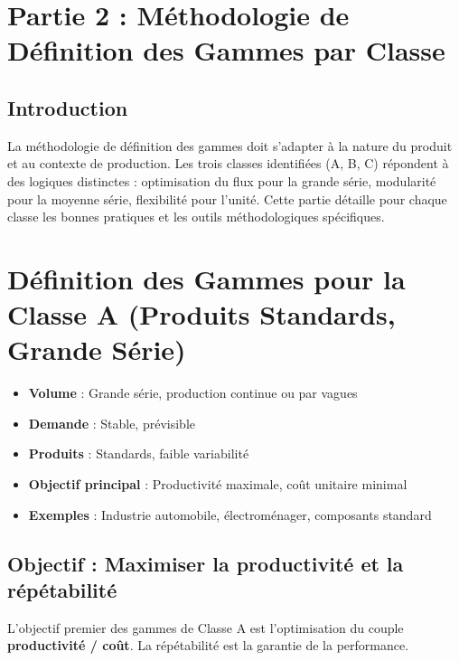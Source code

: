 \documentclass{article}
\begin{document}
\section*{Partie 2 : Méthodologie de Définition des Gammes par Classe}

\subsection*{Introduction}

La méthodologie de définition des gammes doit s'adapter à la nature du produit et au contexte de production. Les trois classes identifiées (A, B, C) répondent à des logiques distinctes : optimisation du flux pour la grande série, modularité pour la moyenne série, flexibilité pour l'unité. Cette partie détaille pour chaque classe les bonnes pratiques et les outils méthodologiques spécifiques.


\section{Définition des Gammes pour la Classe A (Produits Standards, Grande Série)}

\begin{tcolorbox}[colback=blue!10!white, colframe=blue!75!black, title=Caractéristiques de la Classe A]
\begin{itemize}
    \item \textbf{Volume} : Grande série, production continue ou par vagues
    \item \textbf{Demande} : Stable, prévisible
    \item \textbf{Produits} : Standards, faible variabilité
    \item \textbf{Objectif principal} : Productivité maximale, coût unitaire minimal
    \item \textbf{Exemples} : Industrie automobile, électroménager, composants standard
\end{itemize}
\end{tcolorbox}

\subsection{Objectif : Maximiser la productivité et la répétabilité}

L'objectif premier des gammes de Classe A est l'optimisation du couple \textbf{productivité / coût}. La répétabilité est la garantie de la performance.
\end{document}
